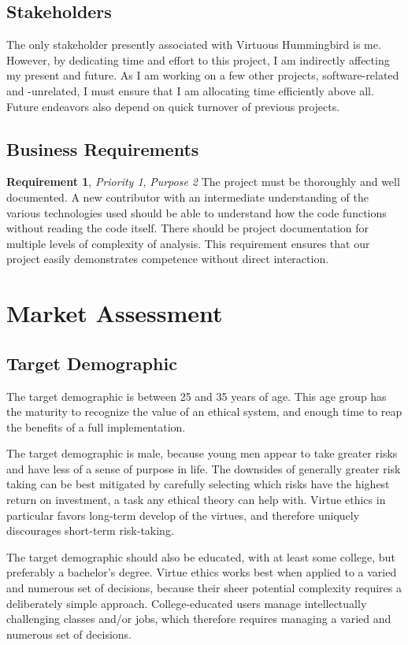 \documentclass{article}
\begin{document}
\subsection{Stakeholders}

The only stakeholder presently associated with Virtuous Hummingbird is me.
However, by dedicating time and effort to this project, I am indirectly affecting my present and future.
As I am working on a few other projects, software-related and -unrelated, I must ensure that I am allocating time efficiently above all.
Future endeavors also depend on quick turnover of previous projects.

\subsection{Business Requirements}

\textbf{Requirement 1}, \textit{Priority 1}, \textit{Purpose 2}
The project must be thoroughly and well documented.
A new contributor with an intermediate understanding of the various technologies used should be able to understand how the code functions without reading the code itself.
There should be project documentation for multiple levels of complexity of analysis.
This requirement ensures that our project easily demonstrates competence without direct interaction.

\section{Market Assessment}

\subsection{Target Demographic}

The target demographic is between 25 and 35 years of age.
This age group has the maturity to recognize the value of an ethical system, and enough time to reap the benefits of a full implementation.

The target demographic is male, because young men appear to take greater risks and have less of a sense of purpose in life.
The downsides of generally greater risk taking can be best mitigated by carefully selecting which risks have the highest return on investment, a task any ethical theory can help with.
Virtue ethics in particular favors long-term develop of the virtues, and therefore uniquely discourages short-term risk-taking.

The target demographic should also be educated, with at least some college, but preferably a bachelor's degree.
Virtue ethics works best when applied to a varied and numerous set of decisions, because their sheer potential complexity requires a deliberately simple approach.
College-educated users manage intellectually challenging classes and/or jobs, which therefore requires managing a varied and numerous set of decisions.
\end{document}
